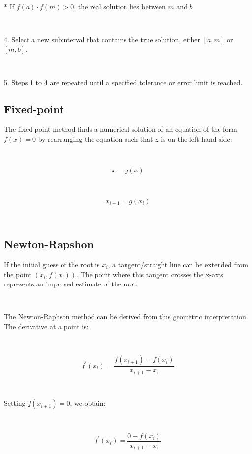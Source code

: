 \documentclass[conference]{IEEEtran}
\begin{document}
\

	* If $ f(a) \cdot f(m) > 0 $, the real solution lies between $ m $ and $ b $

\

4. Select a new subinterval that contains the true solution, either $ [a, m] $ or $ [m, b] $.

\

5. Steps 1 to 4 are repeated until a specified tolerance or error limit is reached.


\subsection{Fixed-point}

The fixed-point method finds a numerical solution of an equation of the form $ f(x) = 0 $ by rearranging the equation such that x is on the left-hand side:

\ 

\begin{equation}
 x =  g(x)
\end{equation}


\


\begin{equation}
 x_{i+1} =  g(x_{i})
\end{equation}

\



\subsection{Newton-Rapshon}

If the initial guess of the root is $ x_{i} $, a tangent/straight line can be extended from the point $ (x_{i}, f(x_{i})) $. The point where this tangent crosses the x-axis represents an improved estimate of the root.


\

The Newton-Raphson method can be derived from this geometric interpretation. The derivative at a point is:


\



\begin{equation}
 f^{'}(x_{i}) = \frac{f(x_{i+1}) - f(x_{i})}{x_{i+1} - x_{i}}
\end{equation}

\ 

Setting $ f(x_{i+1}) = 0 $, we obtain:


\


\begin{equation}
f^{'}(x_{i}) = \frac{0 - f(x_{i})}{x_{i+1} - x_{i}}
\end{equation}
\end{document}
